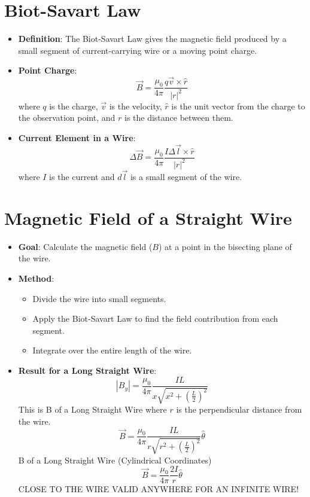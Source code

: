 \documentclass{article}
\begin{document}
\section*{Biot-Savart Law}
\begin{itemize}
    \item \textbf{Definition}: The Biot-Savart Law gives the magnetic field produced by a small segment of current-carrying wire or a moving point charge.
    \item \textbf{Point Charge}:
    \[
    \vec{B} = \frac{\mu_0}{4\pi} \frac{q \vec{v} \times \hat{r}}{|r|^2}
    \]
    where \(q\) is the charge, \(\vec{v}\) is the velocity, \(\hat{r}\) is the unit vector from the charge to the observation point, and \(r\) is the distance between them.
    \item \textbf{Current Element in a Wire}:
    \[
    \Delta\vec{B} = \frac{\mu_0}{4\pi} \frac{I \Delta\vec{l} \times \hat{r}}{|r|^2}
    \]
    where \(I\) is the current and \(d\vec{l}\) is a small segment of the wire.
\end{itemize}

\section*{Magnetic Field of a Straight Wire}
\begin{itemize}
    \item \textbf{Goal}: Calculate the magnetic field (\(B\)) at a point in the bisecting plane of the wire.
    \item \textbf{Method}:
    \begin{itemize}
        \item Divide the wire into small segments.
        \item Apply the Biot-Savart Law to find the field contribution from each segment.
        \item Integrate over the entire length of the wire.
    \end{itemize}
    \item \textbf{Result for a Long Straight Wire}:
    \[
    |B_y| = \frac{\mu_0}{4 \pi} \frac{IL}{x \sqrt{x^2 + (\frac{L}{2})^2}}
    \]
   This is B of a Long Straight Wire where \(r\) is the perpendicular distance from the wire.
\[
\vec{B} = \frac{\mu_0}{4 \pi} \frac{IL}{r \sqrt{r^2 + (\frac{L}{2})^2}} \hat{\theta}
\]
B of a Long Straight Wire (Cylindrical Coordinates)
\[
\vec{B} = \frac{\mu_0}{4 \pi} \frac{2I}{r} \hat{\theta}
\]
CLOSE TO THE WIRE VALID ANYWHERE FOR AN INFINITE WIRE!
\end{itemize}
\end{document}
